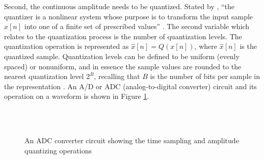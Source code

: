 \documentclass[report.tex]{subfiles}
\begin{document}
Second, the continuous amplitude needs to be quantized. Stated by \citeauthor{discretebook}, ``the quantizer is a nonlinear system whose purpose is to transform the input sample $x[n]$ into one of a finite set of prescribed values'' \parencite[190]{discretebook}. The second variable which relates to the quantization process is the number of quantization levels. The quantization operation is represented as $ \hat{x}[n] = Q(x[n])$, where $\hat{x}[n]$ is the quantized sample. Quantization levels can be defined to be uniform (evenly spaced) or nonuniform, and in essence the sample values are rounded to the nearest quantization level $2^{B}$, recalling that $B$ is the number of bits per sample in the representation \parencite{discretebook}. An A/D or ADC (analog-to-digital converter) circuit and its operation on a waveform is shown in Figure \ref{fig:adccircuit}.

\begin{figure}[ht]
	\centering
	\hspace{0.1em}
	\\
	\vspace{0.1em}
	\\
	\caption{An ADC converter circuit showing the time sampling and amplitude quantizing operations \parencite[188, 190, 192]{discretebook}}
	\label{fig:adccircuit}
\end{figure}
\end{document}
